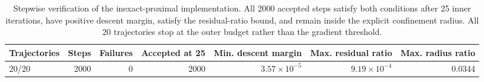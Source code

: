 \begin{table}[t]
\centering
\scriptsize
\setlength{\tabcolsep}{3pt}
\renewcommand{\arraystretch}{1.12}
\begin{tabular}{@{}lrrrrrr@{}}
\hline
Trajectories & Steps & Failures & Accepted at 25 & Min. descent margin & Max. residual ratio & Max. radius ratio \\
\hline
20/20 & 2000 & 0 & 2000 & $3.57\times10^{-5}$ & $9.19\times10^{-4}$ & 0.0344 \\
\hline
\end{tabular}
\caption{Stepwise verification of the inexact-proximal implementation.  All 2000 accepted steps satisfy both conditions after 25 inner iterations, have positive descent margin, satisfy the residual-ratio bound, and remain inside the explicit confinement radius.  All 20 trajectories stop at the outer budget rather than the gradient threshold.}
\label{tab:inexact-proximal-verification}
\end{table}
